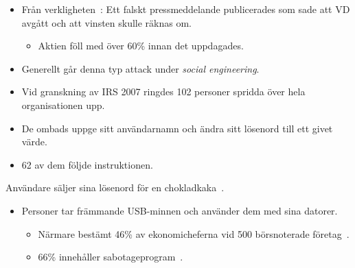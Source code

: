 \documentclass{beamer}
\begin{document}
\begin{frame}
  \begin{example}
    \begin{itemize}
      \item Från verkligheten~\cite{Anderson2008sea}: Ett falskt pressmeddelande 
        publicerades som sade att VD avgått och att vinsten skulle räknas om.
        \begin{itemize}
          \item Aktien föll med över \unit{60}{\%} innan det uppdagades.
        \end{itemize}

      \item Generellt går denna typ attack under \emph{social engineering}.

    \end{itemize}
  \end{example}
\end{frame}

\begin{frame}
  \begin{example}
    \begin{itemize}
      \item Vid granskning av IRS 2007 ringdes 102 personer spridda över hela 
        organisationen upp.

      \item De ombads uppge sitt användarnamn och ändra sitt lösenord till ett 
        givet värde.

      \item 62 av dem följde instruktionen.

    \end{itemize}
  \end{example}
\end{frame}

\begin{frame}
  \begin{example}
    Användare säljer sina lösenord för en chokladkaka~\cite{dn2010choklad}.
  \end{example}

  \begin{example}
    \begin{itemize}
      \item Personer tar främmande USB-minnen och använder dem med sina datorer.
        \begin{itemize}
          \item Närmare bestämt \unit{46}{\%} av ekonomicheferna vid 500 
            börsnoterade företag~\cite{pickupusb}.
          \item \unit{66}{\%} innehåller sabotageprogram~\cite{Sophos2011usbmal}.
        \end{itemize}

    \end{itemize}
  \end{example}
\end{frame}
\end{document}

